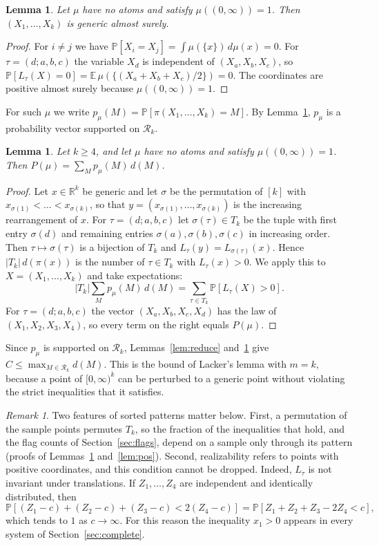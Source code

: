 \documentclass[11pt]{amsart}
\newtheorem{lemma}[theorem]{Lemma}
\theoremstyle{definition}
\theoremstyle{remark}
\newtheorem{remark}[theorem]{Remark}
\numberwithin{equation}{section}
\newcommand{\R}{\mathbb{R}}
\newcommand{\Prob}{\mathbb{P}}
\newcommand{\E}{\mathbb{E}}
\newcommand{\cR}{\mathcal{R}}
\begin{document}
\begin{lemma}\label{lem:generic}
Let $\mu$ have no atoms and satisfy $\mu((0,\infty))=1$. Then $(X_1,\dots,X_k)$ is generic almost surely.
\end{lemma}

\begin{proof}
For $i\ne j$ we have $\Prob[X_i=X_j]=\int\mu(\{x\})\,d\mu(x)=0$. For $\tau=(d;a,b,c)$ the variable $X_d$ is independent of $(X_a,X_b,X_c)$, so $\Prob[L_\tau(X)=0]=\E\,\mu(\{(X_a+X_b+X_c)/2\})=0$. The coordinates are positive almost surely because $\mu((0,\infty))=1$.
\end{proof}

For such $\mu$ we write $p_\mu(M)=\Prob[\pi(X_1,\dots,X_k)=M]$. By Lemma~\ref{lem:generic}, $p_\mu$ is a probability vector supported on $\cR_k$.

\begin{lemma}\label{lem:average}
Let $k\ge4$, and let $\mu$ have no atoms and satisfy $\mu((0,\infty))=1$. Then $P(\mu)=\sum_Mp_\mu(M)\,d(M)$.
\end{lemma}

\begin{proof}
Let $x\in\R^k$ be generic and let $\sigma$ be the permutation of $[k]$ with $x_{\sigma(1)}<\dots<x_{\sigma(k)}$, so that $y=(x_{\sigma(1)},\dots,x_{\sigma(k)})$ is the increasing rearrangement of $x$. For $\tau=(d;a,b,c)$ let $\sigma(\tau)\in T_k$ be the tuple with first entry $\sigma(d)$ and remaining entries $\sigma(a),\sigma(b),\sigma(c)$ in increasing order. Then $\tau\mapsto\sigma(\tau)$ is a bijection of $T_k$ and $L_\tau(y)=L_{\sigma(\tau)}(x)$. Hence $|T_k|\,d(\pi(x))$ is the number of $\tau\in T_k$ with $L_\tau(x)>0$. We apply this to $X=(X_1,\dots,X_k)$ and take expectations:
\[
|T_k|\sum_Mp_\mu(M)\,d(M)=\sum_{\tau\in T_k}\Prob[L_\tau(X)>0].
\]
For $\tau=(d;a,b,c)$ the vector $(X_a,X_b,X_c,X_d)$ has the law of $(X_1,X_2,X_3,X_4)$, so every term on the right equals $P(\mu)$.
\end{proof}

Since $p_\mu$ is supported on $\cR_k$, Lemmas~\ref{lem:reduce} and~\ref{lem:average} give $C\le\max_{M\in\cR_k}d(M)$. This is the bound of Lacker's lemma with $m=k$, because a point of $[0,\infty)^k$ can be perturbed to a generic point without violating the strict inequalities that it satisfies.

\begin{remark}\label{rem:sorting}
Two features of sorted patterns matter below. First, a permutation of the sample points permutes $T_k$, so the fraction of the inequalities that hold, and the flag counts of Section~\ref{sec:flags}, depend on a sample only through its pattern (proofs of Lemmas~\ref{lem:average} and~\ref{lem:pos}). Second, realizability refers to points with positive coordinates, and this condition cannot be dropped. Indeed, $L_\tau$ is not invariant under translations. If $Z_1,\dots,Z_4$ are independent and identically distributed, then
\[
\Prob[(Z_1-c)+(Z_2-c)+(Z_3-c)<2(Z_4-c)]=\Prob[Z_1+Z_2+Z_3-2Z_4<c],
\]
which tends to $1$ as $c\to\infty$. For this reason the inequality $x_1>0$ appears in every system of Section~\ref{sec:complete}.
\end{remark}
\end{document}
